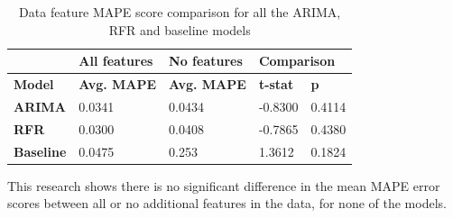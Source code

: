 \begin{table}[H]
\begin{tabular}{l|llll|}
\cline{2-5}
                                        & \multicolumn{1}{l|}{\textbf{All features}} & \multicolumn{1}{l|}{\textbf{No features}} & \multicolumn{2}{l|}{\textbf{Comparison}}          \\ \hline
\multicolumn{1}{|l|}{\textbf{Model}}    & \multicolumn{1}{l|}{\textbf{Avg. MAPE}}    & \multicolumn{1}{l|}{\textbf{Avg. MAPE}}   & \multicolumn{1}{l|}{\textbf{t-stat}} & \textbf{p} \\ \hline
\multicolumn{1}{|l|}{\textbf{ARIMA}}    & 0.0341                                     & 0.0434                                    & -0.8300                              & 0.4114     \\ \hline
\multicolumn{1}{|l|}{\textbf{RFR}}      & 0.0300                                     & 0.0408                                    & -0.7865                              & 0.4380     \\ \hline
\multicolumn{1}{|l|}{\textbf{Baseline}} & 0.0475                                     & 0.253                                     & 1.3612                               & 0.1824     \\ \hline
\end{tabular}
\caption{Data feature MAPE score comparison for all the ARIMA, RFR and baseline models}
\label{tbl:datascores}
\end{table}

This research shows there is no significant difference in the mean MAPE error scores between all or no additional features in the data, for none of the models.
